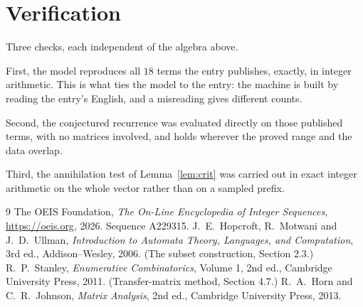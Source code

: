 \documentclass[11pt,a4paper]{article}
\theoremstyle{plain}
\theoremstyle{definition}
\begin{document}
\section{Verification}

Three checks, each independent of the algebra above.

First, the model reproduces all $18$ terms the entry publishes, exactly, in integer
arithmetic. This is what ties the model to the entry: the machine is built by reading the
entry's English, and a misreading gives different counts.

Second, the conjectured recurrence was evaluated directly on those published terms, with no
matrices involved, and holds wherever the proved range and the data overlap.

Third, the annihilation test of Lemma~\ref{lem:crit} was carried out in exact integer
arithmetic on the whole vector rather than on a sampled prefix.

\begin{thebibliography}{9}
 The OEIS Foundation, \emph{The On-Line Encyclopedia of Integer
Sequences}, \url{https://oeis.org}, 2026. Sequence A229315.
 J.~E.~Hopcroft, R.~Motwani and J.~D.~Ullman, \emph{Introduction to Automata
Theory, Languages, and Computation}, 3rd ed., Addison--Wesley, 2006. (The subset
construction, Section 2.3.)
 R.~P.~Stanley, \emph{Enumerative Combinatorics}, Volume 1, 2nd ed.,
Cambridge University Press, 2011. (Transfer-matrix method, Section 4.7.)
 R.~A.~Horn and C.~R.~Johnson, \emph{Matrix Analysis}, 2nd ed., Cambridge
University Press, 2013.
\end{thebibliography}
\end{document}
